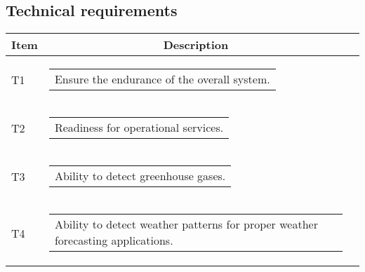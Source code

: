 \subsection{Technical requirements}
\begin{longtable}[H]{l c c}
	\toprule[2pt]
	\textbf{Item} &  \textbf{Description}                                                                                                                                               \\ \midrule
	T1 & \begin{tabular}[c]{@{}l@{}}\begin{minipage}[t]{\linewidth}
			Ensure the endurance of the overall system. \vspace{0.3cm}
	\end{minipage} \end{tabular}                                                                                                                                            \\ \midrule
	T2 & \begin{tabular}[c]{@{}l@{}}\begin{minipage}[t]{\linewidth}
			Readiness for operational services. \vspace{0.3cm}
	\end{minipage} \end{tabular}                                                                                                                                            \\  \midrule
	T3 & \begin{tabular}[c]{@{}l@{}}\begin{minipage}[t]{\linewidth}
			Ability to detect greenhouse gases. \vspace{0.3cm}
	\end{minipage} \end{tabular}                                                                                                                                          \\  \midrule
	T4 & \begin{tabular}[c]{@{}l@{}}\begin{minipage}[t]{\linewidth}
			Ability to detect weather patterns for proper weather forecasting applications. \vspace{0.3cm}
	\end{minipage} \end{tabular}                                                                                                                                           \\  \midrule

\end{longtable}
